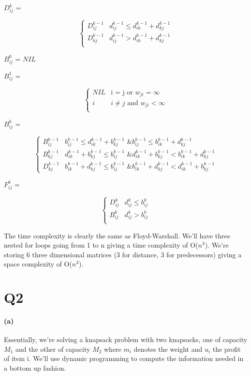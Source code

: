 \documentclass[11pt,a4paper]{article}
\begin{document}
$D_{ij}^{k}$ = 

\[ \begin{cases} 
      D_{ij}^{k-1} & d_{ij}^{k-1} \leq d_{ik}^{k-1} + d_{kj}^{k-1} \\
      D_{kj}^{k-1} & d_{ij}^{k-1} > d_{ik}^{k-1} + d_{kj}^{k-1} \\
   \end{cases}
\]

$B_{ij}^{0}$ = $NIL$


$B_{ij}^{1}$ = 

\[ \begin{cases} 
      NIL & \text{i = j or }w_{ji} = \infty \\
      i & i \neq j\text{ and }w_{ji} < \infty \\
   \end{cases}
\]

$B_{ij}^{k}$ = 

\[ \begin{cases} 
      B_{ij}^{k-1} & b_{ij}^{k-1} \leq d_{ik}^{k-1} + b_{kj}^{k-1}\text{  \&  }b_{ij}^{k-1} \leq b_{ik}^{k-1} + d_{kj}^{k-1}\\
      B_{kj}^{k-1} & d_{ik}^{k-1} + b_{kj}^{k-1} \leq b_{ij}^{k-1}\text{  \&  }d_{ik}^{k-1} + b_{kj}^{k-1} < b_{ik}^{k-1} + d_{kj}^{k-1}\\
      D_{kj}^{k-1} & b_{ik}^{k-1} + d_{kj}^{k-1} \leq b_{ij}^{k-1}\text{  \&  }b_{ik}^{k-1} + d_{kj}^{k-1} < d_{ik}^{k-1} + b_{kj}^{k-1}
   \end{cases}
\]

$F_{ij}^{k}$ = 

\[ \begin{cases} 
      D_{ij}^{k} & d_{ij}^{k} \leq b_{ij}^{k} \\
      B_{ij}^{k} & d_{ij}^{k} > b_{ij}^{k}\\
   \end{cases}
\]

The time complexity is clearly the same as Floyd-Warshall. We'll have three nested for loops going from 1 to n giving a time complexity of O($n^{3}$). We're storing 6 three dimensional matrices (3 for distance, 3 for predecessors) giving a space complexity of O($n^{3}$).


\section*{Q2}

\paragraph{(a)}
Essentially, we're solving a knapsack problem with two knapsacks, one of capacity $M_{1}$ and the other of capacity $M_{2}$ where $m_{i}$ denotes the weight and $u_{i}$ the profit of item i. We'll use dynamic programming to compute the information needed in a bottom up fashion.
\end{document}
